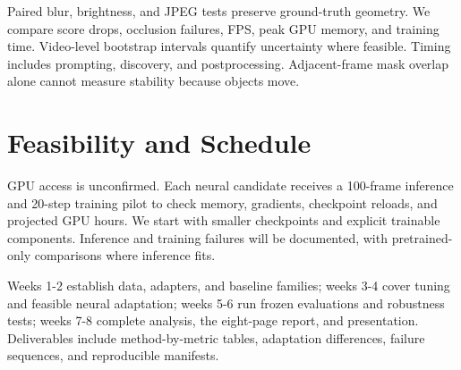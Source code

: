 \documentclass[11pt]{article}
\begin{document}
Paired blur, brightness, and JPEG tests preserve ground-truth geometry. We compare score drops, occlusion failures, FPS, peak GPU memory, and training time. Video-level bootstrap intervals quantify uncertainty where feasible. Timing includes prompting, discovery, and postprocessing. Adjacent-frame mask overlap alone cannot measure stability because objects move.

\section{Feasibility and Schedule}

GPU access is unconfirmed. Each neural candidate receives a 100-frame inference and 20-step training pilot to check memory, gradients, checkpoint reloads, and projected GPU hours. We start with smaller checkpoints and explicit trainable components. Inference and training failures will be documented, with pretrained-only comparisons where inference fits.

Weeks 1-2 establish data, adapters, and baseline families; weeks 3-4 cover tuning and feasible neural adaptation; weeks 5-6 run frozen evaluations and robustness tests; weeks 7-8 complete analysis, the eight-page report, and presentation. Deliverables include method-by-metric tables, adaptation differences, failure sequences, and reproducible manifests.


\end{document}
